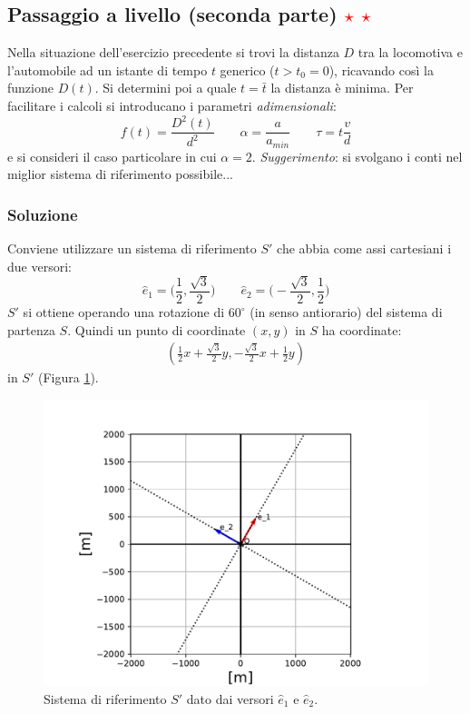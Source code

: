 \documentclass[12pt,a4paper]{book}
\newcommand{\rstar}{ \textcolor{red}{$\star$}}
\begin{document}
\subsection{Passaggio a livello (seconda parte) \rstar\rstar}
Nella situazione dell'esercizio precedente si trovi la distanza $D$ tra la locomotiva e l'automobile ad un istante di tempo $t$ generico ($t>t_0=0$), ricavando così la funzione $D(t)$. Si determini poi a quale $t=\bar{t}$ la distanza è minima. Per facilitare i calcoli si introducano i parametri \textit{adimensionali}:
%
\begin{equation*}
f(t)=\frac{D^2(t)}{d^2}\quad \quad\alpha=\frac{a}{a_{min}}\quad \quad \tau=t\frac{v}{d}
\end{equation*}
%
e si consideri il caso particolare in cui $\alpha=2$.  \textit{Suggerimento}: si svolgano i conti nel miglior sistema di riferimento possibile...


\subsubsection*{Soluzione}
Conviene utilizzare un sistema di riferimento $S'$ che abbia come assi cartesiani i due versori:
%
\begin{equation*}
\hat{e}_1=\big(\frac{1}{2}, \frac{\sqrt{3}}{2}\big) \qquad \hat{e}_2=\big(-\frac{\sqrt{3}}{2}, \frac{1}{2}\big)
\end{equation*}
%
$S'$ si ottiene operando una rotazione di $60^\circ$ (in senso antiorario) del sistema di partenza $S$. Quindi un punto di coordinate $(x,y)$ in $S$ ha coordinate:
%
\begin{gather*}
(\frac{1}{2}x+\frac{\sqrt{3}}{2}y, -\frac{\sqrt{3}}{2}x+\frac{1}{2}y )
\end{gather*}
%
in $S'$ (Figura \ref{fig:sistema2}).  

\begin{figure}[!ht]
 \centering
\includegraphics[scale=0.55]{sistema2.pdf}
\caption{Sistema di riferimento $S'$ dato dai versori $\hat{e}_1$ e $\hat{e}_2$. \label{fig:sistema2} }
\end{figure}
\end{document}
